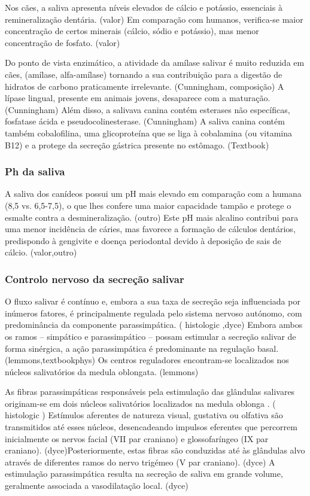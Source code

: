 Nos cães, a saliva apresenta níveis elevados de cálcio e potássio, essenciais à remineralização dentária. (valor) Em comparação com humanos, verifica-se maior concentração de certos minerais (cálcio, sódio e potássio), mas menor concentração de fosfato. (valor)

Do ponto de vista enzimático, a atividade da amílase salivar é muito reduzida em cães, (amílase, alfa-amílase) tornando a sua contribuição para a digestão de hidratos de carbono praticamente irrelevante. (Cunningham, composição) A lípase lingual, presente em animais jovens, desaparece com a maturação. (Cunningham) Além disso, a salivava canina contém esterases não específicas, fosfatase ácida e pseudocolinesterase. (Cunningham) A saliva canina contém também cobalofilina, uma glicoproteína que se liga à cobalamina (ou vitamina B12) e a protege da secreção gástrica presente no estômago. (Textbook) 

\subsubsection{Ph da saliva}

A saliva dos canídeos possui um pH mais elevado em comparação com a humana (8,5 vs. 6,5-7,5), o que lhes confere uma maior capacidade tampão e protege o esmalte contra a desmineralização. (outro) Este pH mais alcalino contribui para uma menor incidência de cáries, mas favorece a formação de cálculos dentários, predispondo à gengivite e doença periodontal devido à deposição de sais de cálcio. (valor,outro)    

\subsubsection{Controlo nervoso da secreção salivar}

O fluxo salivar é contínuo e, embora a sua taxa de secreção seja influenciada por inúmeros fatores, é principalmente regulada pelo sistema nervoso autónomo, com predominância da componente parassimpática. (\cite{Poirier2018} histologic \cite{animals},dyce) Embora ambos os ramos – simpático e parassimpático – possam estimular a secreção salivar de forma sinérgica, a ação parassimpática é predominante na regulação basal. (lemmons,textbookphys) 
Os centros reguladores encontram-se localizados nos núcleos salivatórios da medula oblongata. (lemmons)


As fibras parassimpáticas responsáveis pela estimulação das glândulas salivares originam-se em dois núcleos salivatórios localizados na medula oblonga . (\cite{Poirier2018} histologic \cite{animals}) Estímulos aferentes de natureza visual, gustativa ou olfativa são transmitidos até esses núcleos, desencadeando impulsos eferentes que percorrem inicialmente os nervos facial (VII par craniano) e glossofaríngeo (IX par craniano). (dyce)Posteriormente, estas fibras são conduzidas até às glândulas alvo através de diferentes ramos do nervo trigémeo (V par craniano). (dyce) A estimulação parassimpática resulta na secreção de saliva em grande volume, geralmente associada a vasodilatação local. (dyce)


